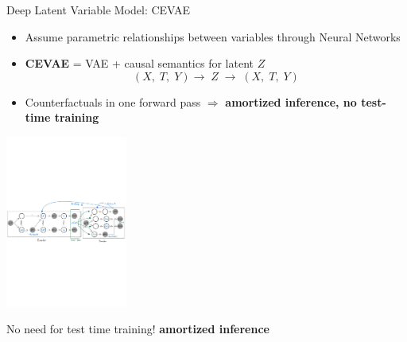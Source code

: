 \documentclass[10pt]{beamer}
\begin{document}
  \begin{frame}{Deep Latent Variable Model: CEVAE}
     \begin{itemize}
         \item Assume parametric relationships between variables through \alert{Neural Networks}
         
         \item \textbf{CEVAE} = VAE + causal semantics for latent \(Z\)  
            \[
              (X,\;T,\;Y)\longrightarrow\;Z \;\longrightarrow\; (X,\;T,\;Y)
            \]
      \item Counterfactuals in one forward pass  \(\Rightarrow\) \textbf{amortized inference, no test-time training}
     \end{itemize}
    \begin{center}
  \includegraphics[width=0.3\textwidth]{images/cevae_architecture.pdf}
\end{center}
    No need for test time training! \textbf{amortized inference}

 \end{frame}
\end{document}
